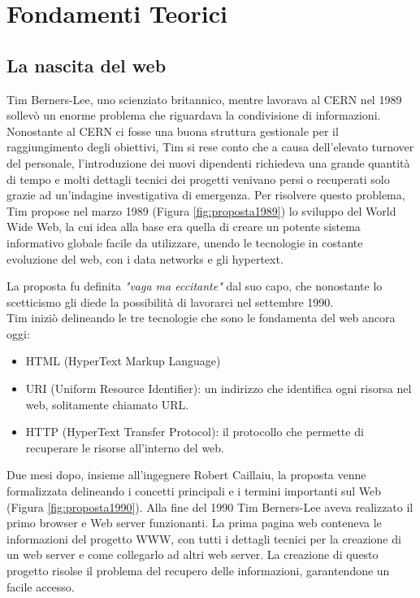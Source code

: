 \mainmatter

\chapter{Fondamenti Teorici}

\section{La nascita del web}
Tim Berners-Lee, uno scienziato britannico, mentre lavorava al CERN nel 1989 sollevò un enorme problema che riguardava la condivisione di informazioni. Nonostante al CERN ci fosse una buona struttura gestionale per il raggiungimento degli obiettivi, Tim si rese conto che a causa dell'elevato turnover del personale, l'introduzione dei nuovi dipendenti richiedeva una grande quantità di tempo e molti dettagli tecnici dei progetti venivano persi o recuperati solo grazie ad un'indagine investigativa di emergenza.
Per risolvere questo problema, Tim propose nel marzo 1989 (Figura \ref{fig:proposta1989}) lo sviluppo del World Wide Web, la cui idea alla base era quella di creare un potente sistema informativo globale facile da utilizzare, unendo le tecnologie in costante evoluzione del web, con i data networks e gli hypertext.

La proposta fu definita \textit{"vaga ma eccitante"} dal suo capo, che nonostante lo scetticismo gli diede la possibilità di lavorarci nel settembre 1990.\\
Tim iniziò delineando le tre tecnologie che sono le fondamenta del web ancora oggi:
\begin{itemize}
\item HTML (HyperText Markup Language)
\item URI (Uniform Resource Identifier): un indirizzo che identifica ogni risorsa nel web, solitamente chiamato URL.
\item HTTP (HyperText Transfer Protocol): il protocollo che permette di recuperare le risorse all'interno del web.
\end{itemize}
Due mesi dopo, insieme all'ingegnere Robert Caillaiu, la proposta venne formalizzata delineando i concetti principali e i termini importanti sul Web (Figura \ref{fig:proposta1990}).
Alla fine del 1990 Tim Berners-Lee aveva realizzato il primo browser e Web server funzionanti.
La prima pagina web conteneva le informazioni del progetto WWW, con tutti i dettagli tecnici per la creazione di un web server e come collegarlo ad altri web server.
La creazione di questo progetto risolse il problema del recupero delle informazioni, garantendone un facile accesso.\cite{historyOfWeb}\cite{historyOfWeb2}

